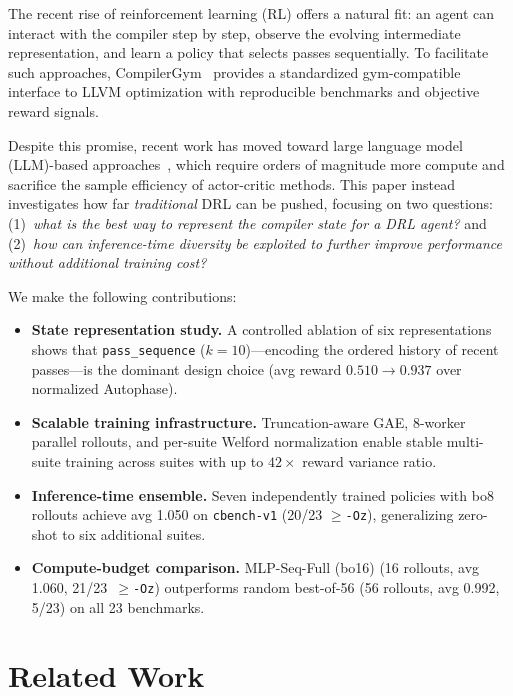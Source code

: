 \documentclass{article}
\begin{document}
The recent rise of reinforcement learning (RL) offers a natural fit: an agent
can interact with the compiler step by step, observe the evolving intermediate
representation, and learn a policy that selects passes sequentially.
To facilitate such approaches, CompilerGym~\cite{CompilerGym} provides a
standardized gym-compatible interface to LLVM optimization with reproducible
benchmarks and objective reward signals.

Despite this promise, recent work has moved toward large language model
(LLM)-based approaches~\cite{pan2026compiler}, which require orders of
magnitude more compute and sacrifice the sample efficiency of actor-critic
methods.  This paper instead investigates how far \emph{traditional} DRL can
be pushed, focusing on two questions: (1)~\emph{what is the best way to
represent the compiler state for a DRL agent?} and (2)~\emph{how can
inference-time diversity be exploited to further improve performance without
additional training cost?}

We make the following contributions:
\begin{itemize}
  \item \textbf{State representation study.}  A controlled ablation of six
        representations shows that \texttt{pass\_sequence} ($k{=}10$)---encoding
        the ordered history of recent passes---is the dominant design choice
        (avg reward $0.510\to0.937$ over normalized Autophase).
  \item \textbf{Scalable training infrastructure.}  Truncation-aware GAE,
        8-worker parallel rollouts, and per-suite Welford normalization enable
        stable multi-suite training across suites with up to $42\times$ reward
        variance ratio.
  \item \textbf{Inference-time ensemble.}  Seven independently trained policies
        with bo8 rollouts achieve avg 1.050 on \texttt{cbench-v1} (20/23
        $\geq$\texttt{-Oz}), generalizing zero-shot to six additional suites.
  \item \textbf{Compute-budget comparison.}  MLP-Seq-Full (bo16) (16 rollouts,
        avg 1.060, 21/23~$\geq$\texttt{-Oz}) outperforms random best-of-56
        (56 rollouts, avg 0.992, 5/23) on all 23 benchmarks.
\end{itemize}


\section{Related Work}
\end{document}
